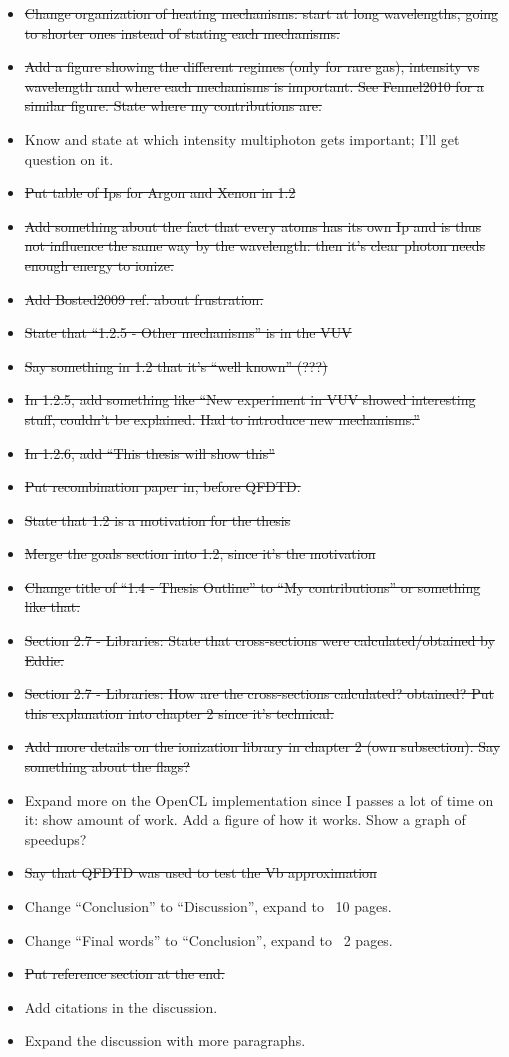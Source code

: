 \begin{itemize}
\item \sout{Change organization of heating mechanisms: start at long wavelengths, going
to shorter ones instead of stating each mechanisms.}
\item \sout{Add a figure showing the different regimes (only for rare gas), intensity
vs wavelength and where each mechanisms is important. See Fennel2010 for a
similar figure. State where my contributions are.}
\item Know and state at which intensity multiphoton gets important; I'll get
question on it.
\item \sout{Put table of Ips for Argon and Xenon in 1.2}
\item \sout{Add something about the fact that every atoms has its own Ip and is thus
not influence the same way by the wavelength: then it's clear photon needs
enough energy to ionize.}
\item \sout{Add Bosted2009 ref. about frustration.}
\item \sout{State that ``1.2.5 - Other mechanisms'' is in the VUV}
\item \sout{Say something in 1.2 that it's ``well known'' (???)}
\item \sout{In 1.2.5, add something like ``New experiment in VUV showed interesting
stuff, couldn't be explained. Had to introduce new mechanisms.''}
\item \sout{In 1.2.6, add ``This thesis will show this''}
\item \sout{Put recombination paper in, before QFDTD.}
\item \sout{State that 1.2 is a motivation for the thesis}
\item \sout{Merge the goals section into 1.2, since it's the motivation}
\item \sout{Change title of ``1.4 - Thesis Outline'' to ``My contributions'' or
something like that.}
\item \sout{Section 2.7 - Libraries: State that cross-sections were calculated/obtained
by Eddie.}
\item \sout{Section 2.7 - Libraries: How are the cross-sections calculated? obtained?
Put this explanation into chapter 2 since it's technical.}
\item \sout{Add more details on the ionization library in chapter 2 (own subsection).
Say something about the flags?}
\item Expand more on the OpenCL implementation since I passes a lot of time on
it: show amount of work. Add a figure of how it works. Show a graph of speedups?
\item \sout{Say that QFDTD was used to test the Vb approximation}
\item Change ``Conclusion'' to ``Discussion'', expand to ~10 pages.
\item Change ``Final words'' to ``Conclusion'', expand to ~2 pages.
\item \sout{Put reference section at the end.}
\item Add citations in the discussion.
\item Expand the discussion with more paragraphs.
\end{itemize}

